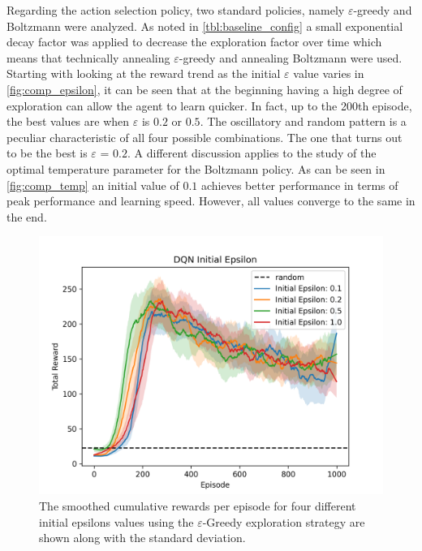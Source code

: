 \documentclass{article}
\begin{document}
Regarding the action selection policy, two standard policies, namely $\varepsilon$-greedy and Boltzmann were analyzed. 
As noted in \autoref{tbl:baseline_config} a small exponential decay factor was applied to decrease the exploration factor over time which means that technically annealing $\varepsilon$-greedy and annealing Boltzmann were used.
Starting with looking at the reward trend as the initial $\varepsilon$ value varies in \autoref{fig:comp_epsilon}, 
it can be seen that at the beginning having a high degree of exploration can allow the agent to learn quicker.
In fact, up to the 200th episode, the best values are when $\varepsilon$ is $0.2$ or $0.5$.  
The oscillatory and random pattern is a peculiar characteristic of all four possible combinations. 
The one that turns out to be the best is $\varepsilon$ = $0.2$.
A different discussion applies to the study of the optimal temperature parameter for the Boltzmann policy. 
As can be seen in \autoref{fig:comp_temp} an initial value of $0.1$ achieves better performance in terms of peak performance and learning speed. 
However, all values converge to the same in the end. 

\begin{figure}[ht!]
   \centering
   \includegraphics[width=0.9\columnwidth]{assets/fig_hp/epsilon.initial.png}
   \caption{The smoothed cumulative rewards per episode for four different initial epsilons values using the $\varepsilon$-Greedy exploration strategy are shown along with the standard deviation. 
   }
   \label{fig:comp_epsilon}
\end{figure}
\end{document}
